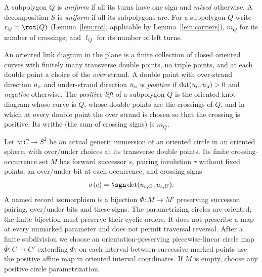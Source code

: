\begin{definition}\label{def:uniform}\leanok
A subpolygon $Q$ is \emph{uniform} if all its turns have one sign and
\emph{mixed} otherwise. A decomposition $S$ is \emph{uniform} if all its
subpolygons are. For a subpolygon $Q$ write $r_Q=\rot(Q)$
(Lemma~\ref{lem:rot}, applicable by Lemma~\ref{lem:carriers}), $m_Q$ for its
number of crossings, and $\ell_Q$ for its number of left turns.
\end{definition}

\begin{definition}\label{def:positive-lift}\leanok
An oriented link diagram in the plane is a finite collection of closed
oriented curves with finitely many transverse double points, no triple points,
and at each double point a choice of the \emph{over} strand. A double point
with over-strand direction $u_{\rm o}$ and under-strand direction $u_{\rm u}$
is \emph{positive} if $\det(u_{\rm o},u_{\rm u})>0$ and \emph{negative}
otherwise. The \emph{positive lift} of a subpolygon $Q$ is the oriented knot
diagram whose curve is $Q$, whose double points are the crossings of $Q$, and
in which at every double point the over strand is chosen so that the crossing
is positive. Its writhe (the sum of crossing signs) is $m_Q$.
\end{definition}

\begin{definition}\label{def:gauss-record}\leanok
Let $\gamma:C\to S^2$ be an actual generic immersion of an oriented
circle in an oriented sphere, with over/under choices at its transverse
double points. Its finite crossing-occurrence set $M$ has forward successor
$s$, pairing involution $\tau$ without fixed points, an over/under bit at
each occurrence, and crossing signs
\begin{equation}\label{eq:gauss-cross-sign}
 \sigma(c)=\sgn\det(u_{c,O},u_{c,U}).
\end{equation}
A named record isomorphism is a bijection $\Phi:M\to M'$ preserving
successor, pairing, over/under bits and these signs. The parametrizing
circles are oriented; the finite bijection must preserve their cyclic
orders. It does not prescribe a map at every unmarked parameter and
does not permit traversal reversal. After a finite subdivision we choose
an orientation-preserving piecewise-linear circle map
$\overline\Phi:C\to C'$ extending $\Phi$: on each interval between
successive marked points use the positive affine map in oriented interval
coordinates. If $M$ is empty, choose any positive circle parametrization.
\end{definition}

